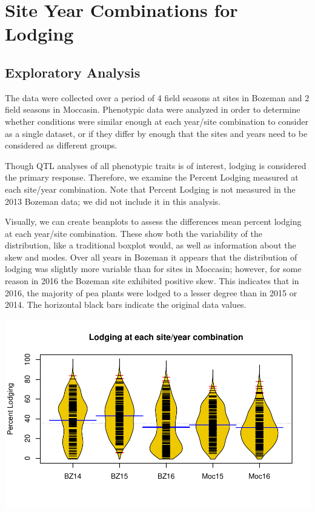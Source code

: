 \documentclass[11pt]{article}\usepackage[]{graphicx}\usepackage[]{color}
\makeatletter
\def\maxwidth{ %
  \ifdim\Gin@nat@width>\linewidth
    \linewidth
  \else
    \Gin@nat@width
  \fi
}
\newenvironment{knitrout}{}{} %
\makeatother
\begin{document}
\section{Site Year Combinations for Lodging}




\subsection{Exploratory Analysis} 
The data were collected over a period of 4 field seasons at sites in Bozeman and 2 field seasons in Moccasin. Phenotypic data were analyzed in order to determine whether conditions were similar enough at each year/site combination to consider as a single dataset, or if they differ by enough that the sites and years need to be considered as different groups.  

Though QTL analyses of all phenotypic traits is of interest, lodging is considered the primary response. Therefore, we examine the Percent Lodging measured at each site/year combination. Note that Percent Lodging is not measured in the 2013 Bozeman data; we did not include it in this analysis.

Visually, we can create beanplots to assess the differences mean percent lodging at each year/site combination.  These show both the variability of the distribution, like a traditional boxplot would, as well as information about the skew and modes. Over all years in Bozeman it appears that the distribution of lodging was slightly more variable than for sites in Moccasin; however, for some reason in 2016 the Bozeman site exhibited positive skew.  This indicates that in 2016, the majority of pea plants were lodged to a lesser degree than in 2015 or 2014.  The horizontal black bars indicate the original data values. 


\begin{knitrout}\footnotesize
{}\color{fgcolor}

{\centering \includegraphics[width=\maxwidth]{figure/meanvars-1} 

}



\end{knitrout}
\end{document}
